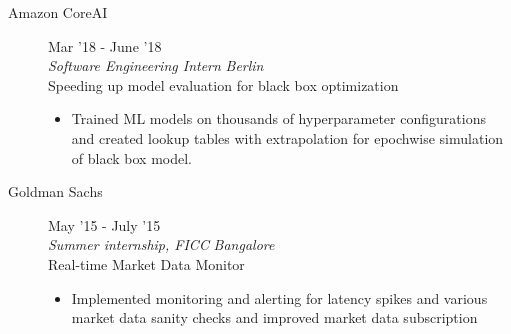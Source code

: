 \documentclass[9pt]{article}
\newenvironment{changemargin}[2]{%
  \begin{list}{}{%
      \setlength{\topsep}{0pt}%
    \setlength{\leftmargin}{#1}%
    \setlength{\rightmargin}{#2}%
    \setlength{\listparindent}{\parindent}%
  \setlength{\itemindent}{\parindent}%
    \setlength{\parsep}{\parskip}%
    }%
  \item[]}{\end{list}
    }
\newenvironment{body} {
  \vspace*{-16pt}
        \begin{changemargin}{-0.6in}{-0.65in}
        }	
        {\end{changemargin}
}
\begin{document}
\begin{body}
  \begin{description}
    \item[Amazon CoreAI] \hfill {Mar '18 - June '18} \\
      \textit{Software Engineering Intern} \hfill \textit{Berlin} \\
      \normalsize{Speeding up model evaluation for black box optimization}
      \begin{itemize}
        \item Trained ML models on thousands of hyperparameter configurations and created lookup tables with extrapolation for epochwise simulation of black box model.
      \end{itemize}


    \item[Goldman Sachs] \hfill {May '15 - July '15} \\
      \textit{Summer internship, FICC}  \hfill \textit{Bangalore} \\
      \normalsize{Real-time Market Data Monitor}
      \begin{itemize}
        \item Implemented monitoring and alerting for latency spikes and various market data sanity checks and improved market data subscription
      \end{itemize}

  \end{description}

\end{body}
\end{document}
